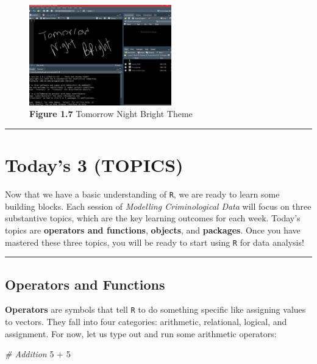 \documentclass[
]{book}
\newenvironment{Shaded}{\begin{snugshade}}{\end{snugshade}}
\newcommand{\CommentTok}[1]{\textcolor[rgb]{0.56,0.35,0.01}{\textit{#1}}}
\newcommand{\DecValTok}[1]{\textcolor[rgb]{0.00,0.00,0.81}{#1}}
\newcommand{\SpecialCharTok}[1]{\textcolor[rgb]{0.00,0.00,0.00}{#1}}
\begin{document}
\begin{figure}
\centering
\includegraphics[width=0.55\textwidth,height=\textheight]{Images/tomorrow night bright.png}
\caption{\textbf{Figure 1.7} Tomorrow Night Bright Theme}
\end{figure}

\begin{center}\rule{0.5\linewidth}{0.5pt}\end{center}

\hypertarget{todays-3-topics}{%
\section{Today's 3 (TOPICS)}\label{todays-3-topics}}

Now that we have a basic understanding of \texttt{R}, we are ready to learn some building blocks. Each session of \emph{Modelling Criminological Data} will focus on three substantive topics, which are the key learning outcomes for each week. Today's topics are \textbf{operators and functions}, \textbf{objects}, and \textbf{packages}. Once you have mastered these three topics, you will be ready to start using \texttt{R} for data analysis!

\begin{center}\rule{0.5\linewidth}{0.5pt}\end{center}

\hypertarget{operators-and-functions}{%
\subsection{Operators and Functions}\label{operators-and-functions}}

\textbf{Operators} are symbols that tell \texttt{R} to do something specific like assigning values to vectors. They fall into four categories: arithmetic, relational, logical, and assignment. For now, let us type out and run some arithmetic operators:

\begin{Shaded}
\begin{Highlighting}[]
\CommentTok{\# Addition}
\DecValTok{5} \SpecialCharTok{+} \DecValTok{5}
\end{Highlighting}
\end{Shaded}
\end{document}
